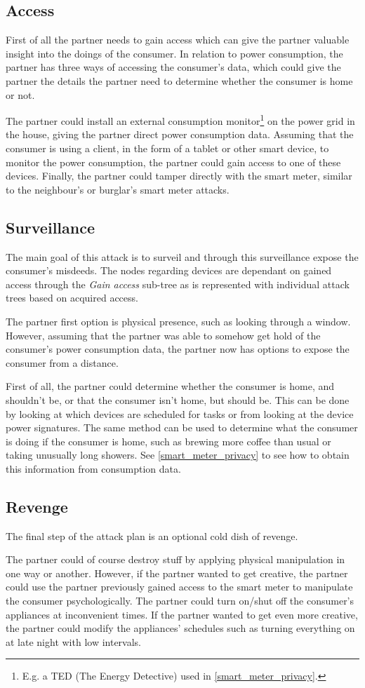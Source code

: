 \subsection{Access}
First of all the partner needs to gain access which can give the partner valuable insight into the doings of the consumer.
In relation to power consumption, the partner has three ways of accessing the consumer's data, which could give the partner the details the partner need to determine whether the consumer is home or not.

The partner could install an external consumption monitor\footnote{E.g. a TED (The Energy Detective) used in \cref {smart_meter_privacy}.} on the power grid in the house, giving the partner direct power consumption data.
Assuming that the consumer is using a client, in the form of a tablet or other smart device, to monitor the power consumption, the partner could gain access to one of these devices.
Finally, the partner could tamper directly with the smart meter, similar to the neighbour's or burglar's smart meter attacks.

\subsection{Surveillance}
The main goal of this attack is to surveil and through this surveillance expose the consumer's misdeeds.
The nodes regarding devices are dependant on gained access through the \textit{Gain access} sub-tree as is represented with individual attack trees based on acquired access.

The partner first option is physical presence, such as looking through a window.
However, assuming that the partner was able to somehow get hold of the consumer's power consumption data, the partner now has options to expose the consumer from a distance.

First of all, the partner could determine whether the consumer is home, and shouldn't be, or that the consumer isn't home, but should be.
This can be done by looking at which devices are scheduled for tasks or from looking at the device power signatures.
The same method can be used to determine what the consumer is doing if the consumer is home, such as brewing more coffee than usual or taking unusually long showers.
See \cref{smart_meter_privacy} to see how to obtain this information from consumption data.

\subsection{Revenge}
The final step of the attack plan is an optional cold dish of revenge.

The partner could of course destroy stuff by applying physical manipulation in one way or another.
However, if the partner wanted to get creative, the partner could use the partner previously gained access to the smart meter to manipulate the consumer psychologically.
The partner could turn on/shut off the consumer's appliances at inconvenient times.
If the partner wanted to get even more creative, the partner could modify the appliances' schedules such as turning everything on at late night with low intervals.
